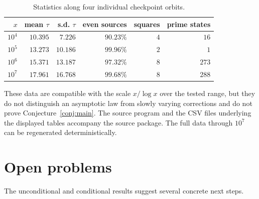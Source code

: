 \documentclass[11pt]{article}
\theoremstyle{definition}
\theoremstyle{remark}
\begin{document}
\begin{table}[htbp]
\centering
\small
\caption{Statistics along four individual checkpoint orbits.}
\label{tab:orbit-statistics}
\begin{tabular}{@{}r r r r r r@{}}
\toprule
$x$ & mean $\tau$ & s.d. $\tau$ & even sources & squares & prime states\\
\midrule
$10^4$ & $10.395$ & $7.226$  & $90.23\%$ & $4$ & $16$\\
$10^5$ & $13.273$ & $10.186$ & $99.96\%$ & $2$ & $1$\\
$10^6$ & $15.371$ & $13.187$ & $97.32\%$ & $8$ & $273$\\
$10^7$ & $17.961$ & $16.768$ & $99.68\%$ & $8$ & $288$\\
\bottomrule
\end{tabular}
\end{table}

These data are compatible with the scale $x/\log x$ over the tested
range, but they do not distinguish an asymptotic law from slowly varying
corrections and do not prove Conjecture~\ref{conj:main}.  The source
program and the CSV files underlying the displayed tables accompany the
source package.  The full data through $10^7$ can be regenerated
deterministically.

\section{Open problems}\label{sec:open}

The unconditional and conditional results suggest several concrete
next steps.
\end{document}
